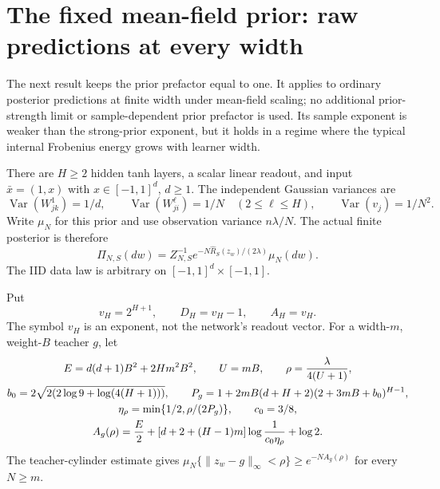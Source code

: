 \section{The fixed mean-field prior: raw predictions at every width}
\label{sec:fixed-meanfield}

The next result keeps the prior prefactor equal to one.  It applies to
ordinary posterior predictions at finite width under mean-field scaling;
no additional prior-strength limit or sample-dependent prior prefactor is
used.  Its sample exponent is weaker than the strong-prior exponent, but
it holds in a regime where the typical internal Frobenius energy grows
with learner width.

There are $H\ge2$ hidden tanh layers, a scalar linear readout, and input
$\bar x=(1,x)$ with $x\in[-1,1]^d$, $d\ge1$.  The independent Gaussian
variances are
\[
 \operatorname{Var}(W^1_{jk})=1/d,\qquad
 \operatorname{Var}(W^\ell_{ji})=1/N\quad(2\le\ell\le H),
 \qquad \operatorname{Var}(v_j)=1/N^2.
\]
Write $\mu_N$ for this prior and use observation variance $n\lambda/N$.
The actual finite posterior is therefore
\begin{equation}\label{eq:mf-raw-posterior}
 \Pi_{N,S}(dw)=Z_{N,S}^{-1}
     e^{-N\widehat R_S(z_w)/(2\lambda)}\mu_N(dw).
\end{equation}
The IID data law is arbitrary on $[-1,1]^d\times[-1,1]$.

Put
\begin{equation}\label{eq:mf-improved-degrees}
 v_H=2^{H+1},\qquad D_H=v_H-1,\qquad A_H=v_H.
\end{equation}
The symbol $v_H$ is an exponent, not the network's readout vector.
For a width-$m$, weight-$B$ teacher $g$, let
\begin{gather}
 E=d(d+1)B^2+2Hm^2B^2,\qquad U=mB,\qquad
 \rho=\frac{\lambda}{4(U+1)},\notag\\
 b_0=2\sqrt{2(2\log9+\log(4(H+1)))},\qquad
 P_g=1+2mB(d+H+2)(2+3mB+b_0)^{H-1},\notag\\
 \eta_\rho=\min\{1/2,\rho/(2P_g)\},\qquad c_0=3/8,\notag\\
 A_g(\rho)=\frac E2+[d+2+(H-1)m]\log\frac1{c_0\eta_\rho}+\log2.
 \label{eq:mf-teacher-cost}
\end{gather}
The teacher-cylinder estimate gives
$\mu_N\{\|z_w-g\|_\infty<\rho\}\ge e^{-NA_g(\rho)}$
for every $N\ge m$.

